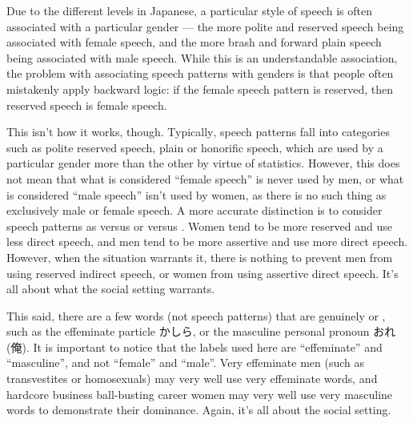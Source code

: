 \documentclass[11pt, b5paper, twoside, openright, onecolumn]{book}
\makeatletter
\newcommand*{\rubystack}[2]{{\relscale{0.5}%
  \begin{tabular}[b]{@{}c@{}}%
    {#1}\\%
   {\textscale{2}{#2}}%
  \end{tabular}}%
}
\DeclareRobustCommand*{\ruby}[2]{%
  \mbox{%
    \setlength{\parskip}{0ex}%
    \BeginAccSupp{method=pdfstringdef,ActualText={#1}}%
      \rubystack{\phantom{#2}}{#1}%
      \llap{%
        \rubystack{#2}{\phantom{#1}}%
      }%
    \EndAccSupp{}%
  }%
}
\renewcommand*{\ruby}[2]{#2 (#1)}%
\makeatother
\begin{document}
Due to the different  levels in Japanese‚ a particular style of speech is often associated with a particular gender — the more polite and reserved speech being associated with female speech‚ and the more brash and forward plain speech being associated with male speech. While this is an understandable association‚ the problem with associating speech patterns with genders is that people often mistakenly apply backward logic: if the female speech pattern is reserved‚ then reserved speech is female speech.

This isn’t how it works‚ though. Typically‚ speech patterns fall into categories such as polite reserved speech‚ plain  or honorific speech‚ which are used by a particular gender more than the other by virtue of statistics. However‚ this does not mean that what is considered “female speech” is never used by men‚ or what is considered “male speech” isn’t used by women‚ as there is no such thing as exclusively male or female speech. A more accurate distinction is to consider speech patterns as  versus  or  versus . Women tend to be more reserved and use less direct speech‚ and men tend to be more assertive and use more direct speech. However‚ when the situation warrants it‚ there is nothing to prevent men from using reserved indirect speech‚ or women from using assertive direct speech. It’s all about what the social setting warrants.

This said‚ there are a few words (not speech patterns) that are genuinely  or ‚ such as the effeminate  particle かしら‚ or the masculine personal pronoun \ruby{俺}{おれ}. It is important to notice that the labels used here are “effeminate” and “masculine”‚ and not “female” and “male”. Very effeminate men (such as transvestites or homosexuals) may very well use very effeminate words‚ and hardcore business ball-busting career women may very well use very masculine words to demonstrate their dominance. Again‚ it’s all about the social setting.
\end{document}
